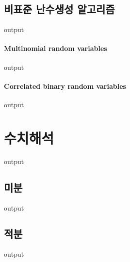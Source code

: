 \documentclass{report}
\begin{document}
\subsection{비표준 난수생성 알고리즘}
\begin{Schunk}
\begin{Soutput}
output
\end{Soutput}
\end{Schunk}
\paragraph{Multinomial random variables}
\begin{Schunk}
\begin{Soutput}
output
\end{Soutput}
\end{Schunk}

\paragraph{Correlated binary random variables}
\begin{Schunk}
\begin{Soutput}
output
\end{Soutput}
\end{Schunk}

\section{수치해석}
\begin{Schunk}
\begin{Soutput}
output
\end{Soutput}
\end{Schunk}

\subsection{미분}
\begin{Schunk}
\begin{Soutput}
output
\end{Soutput}
\end{Schunk}

\subsection{적분}
\begin{Schunk}
\begin{Soutput}
output
\end{Soutput}
\end{Schunk}
\end{document}
